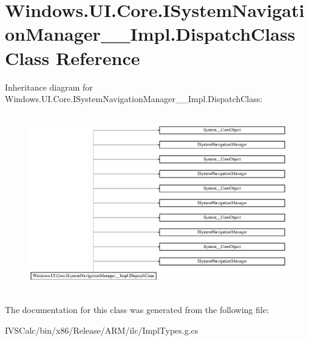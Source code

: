 \hypertarget{class_windows_1_1_u_i_1_1_core_1_1_i_system_navigation_manager_____impl_1_1_dispatch_class}{}\section{Windows.\+U\+I.\+Core.\+I\+System\+Navigation\+Manager\+\_\+\+\_\+\+Impl.\+Dispatch\+Class Class Reference}
\label{class_windows_1_1_u_i_1_1_core_1_1_i_system_navigation_manager_____impl_1_1_dispatch_class}
Inheritance diagram for Windows.\+U\+I.\+Core.\+I\+System\+Navigation\+Manager\+\_\+\+\_\+\+Impl.\+Dispatch\+Class\+:\begin{figure}[H]
\begin{center}
\leavevmode
\includegraphics[height=7.797468cm]{class_windows_1_1_u_i_1_1_core_1_1_i_system_navigation_manager_____impl_1_1_dispatch_class}
\end{center}
\end{figure}


The documentation for this class was generated from the following file\+:\begin{DoxyCompactItemize}
\item 
I\+V\+S\+Calc/bin/x86/\+Release/\+A\+R\+M/ilc/Impl\+Types.\+g.\+cs\end{DoxyCompactItemize}
